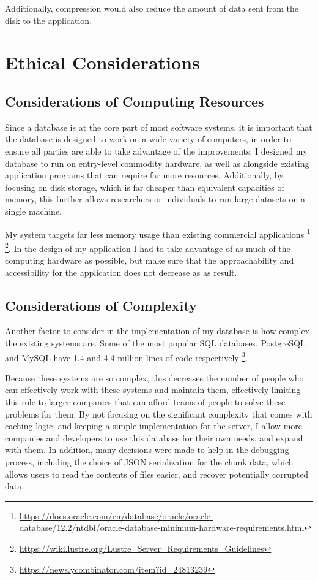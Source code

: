 \documentclass[10pt,twocolumn]{article}
\begin{document}
Additionally, compression would also reduce the amount of data sent from the
disk to the application.

\section{Ethical Considerations}

\subsection{Considerations of Computing Resources}

Since a database is at the core part of most software systems, it is important
that the database is designed to work on a wide variety of computers, in order
to ensure all parties are able to take advantage of the improvements. I
designed my database to run on entry-level commodity hardware, as well as
alongside existing application programs that can require far more resources.
Additionally, by focusing on disk storage, which is far cheaper than equivalent
capacities of memory, this further allows researchers or individuals to run
large datasets on a single machine.

My system targets far less memory usage than existing commercial applications
\footnote{\url{https://docs.oracle.com/en/database/oracle/oracle-database/12.2/ntdbi/oracle-database-minimum-hardware-requirements.html}}
\footnote{\url{https://wiki.lustre.org/Lustre_Server_Requirements_Guidelines}}.
In the design of my application I had to take advantage of as much of the
computing hardware as possible, but make sure that the approachability and
accessibility for the application does not decrease as as result.


\subsection{Considerations of Complexity}
Another factor to consider in the implementation of my database is how complex
the existing systems are. Some of the most popular SQL databases, PostgreSQL and
MySQL have 1.4 and 4.4 million lines of code respectively
\footnote{\url{https://news.ycombinator.com/item?id=24813239}}.

Because these systems are so complex, this decreases the number of people who
can effectively work with these systems and maintain them, effectively limiting
this role to larger companies that can afford teams of people to solve these
problems for them. By not focusing on the significant complexity that comes with
caching logic, and keeping a simple implementation for the server, I allow more
companies and developers to use this database for their own needs, and expand
with them. In addition, many decisions were made to help in the debugging
process, including the choice of JSON serialization for the chunk data, which
allows users to read the contents of files easier, and recover potentially
corrupted data.
\end{document}
